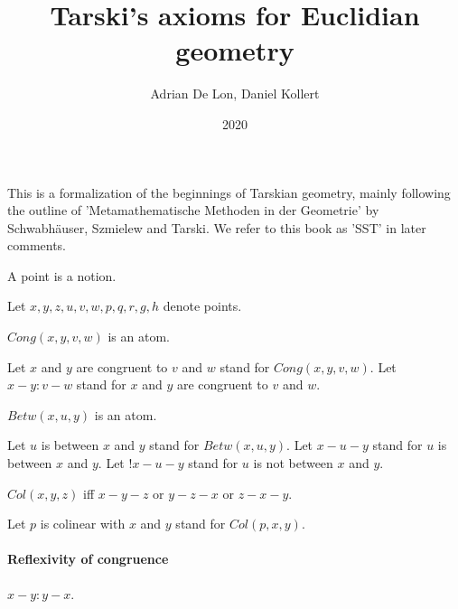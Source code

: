 \documentclass{article}
\title{Tarski's axioms for Euclidian geometry}
\author{Adrian De Lon, Daniel Kollert}
\date{2020}
\begin{document}

  \maketitle

  This is a formalization of the beginnings of Tarskian geometry, mainly following the outline of 'Metamathematische Methoden in der Geometrie' by Schwabhäuser, Szmielew and Tarski. We refer to this book as 'SST' in later comments.

  \begin{forthel}

    \begin{signature}
      A point is a notion.
    \end{signature}

    Let $x,y,z,u,v,w,p,q,r,g,h$ denote points.


    \begin{signature}
      $Cong(x,y,v,w)$ is an atom.
    \end{signature}

    Let $x$ and $y$ are congruent to $v$ and $w$ stand for $Cong(x,y,v,w)$.
    Let $x-y : v-w$ stand for $x$ and $y$ are congruent to $v$ and $w$.

    \begin{signature}
      $Betw(x,u,y)$ is an atom.
    \end{signature}

    Let $u$ is between $x$ and $y$ stand for $Betw(x,u,y)$.
    Let $x-u-y$ stand for $u$ is between $x$ and $y$.
    Let $!x-u-y$ stand for $u$ is not between $x$ and $y$.


    \begin{definition}
      $Col(x,y,z)$ iff $x-y-z$ or $y-z-x$ or $z-x-y$.
    \end{definition}

    Let $p$ is colinear with $x$ and $y$ stand for $Col(p,x,y)$.
  \end{forthel}


  \paragraph{Reflexivity of congruence}

  \begin{forthel}
    \begin{axiom}[A1]
      $x-y : y-x$.
    \end{axiom}
  \end{forthel}
\end{document}
